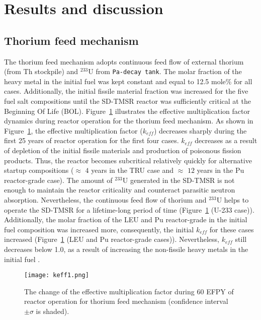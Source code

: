\section{Results and discussion} \label{Results-and-discussion}

\subsection{Thorium feed mechanism}

The thorium feed mechanism adopts continuous feed flow of external thorium (from Th stockpile) and 
$^{233}$U from \texttt{Pa-decay tank}. The molar fraction of the heavy metal 
in the initial fuel was kept constant and equal to 12.5 mole\% for all cases. 
Additionally, the initial fissile material fraction was increased for the five fuel 
salt compositions until the \gls{SD-TMSR} reactor was sufficiently critical at 
the Beginning Of Life (BOL). 
Figure~\ref{fig:keff1} illustrates the effective multiplication factor 
dynamics during reactor operation for the thorium feed mechanism. As shown in 
Figure~\ref{fig:keff1}, the effective multiplication factor ($k_{eff}$) 
decreases sharply during the first 25 years of reactor operation for the first 
four cases. $k_{eff}$ decreases as a result of depletion of the initial 
fissile materials and production of poisonous fission products. Thus, the 
reactor becomes subcritical relatively quickly for alternative startup 
compositions ($\approx$ $4$ years in the \gls{TRU} case and $\approx$ $12$ 
years in the Pu reactor-grade case). The amount of $^{233}$U generated in 
the \gls{SD-TMSR} is not enough to maintain the reactor criticality and 
counteract parasitic neutron absorption. Nevertheless, 
the continuous feed flow of thorium and $^{233}$U helps to operate the 
\gls{SD-TMSR} for a lifetime-long period of time (Figure~\ref{fig:keff1} (U-233 case)). 
Additionally, the molar fraction of the LEU and Pu reactor-grade in the initial fuel composition was increased
more, consequently, the initial $k_{eff}$ for these cases increased (Figure~\ref{fig:keff1} (LEU and Pu reactor-grade cases)). Nevertheless, $k_{eff}$ still decreases below 1.0, as a result of increasing the non-fissile heavy metals in the initial fuel \cite{betzler2016modeling}.

\begin{figure}
	\centering
	\texttt{[image: keff1.png]}
		\vspace{-0.5in}
	\caption{The change of the effective multiplication factor during 60 \gls{EFPY} of reactor operation for thorium feed mechanism (confidence interval $\pm\sigma$ is shaded).} 
	\label{fig:keff1}
\end{figure}


